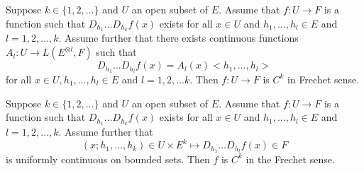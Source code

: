 \begin{proposition}
    Suppose $k \in \{ 1, 2, \ldots\}$ and $U$ an open subset of $E$. Assume that $f: U \rightarrow F$ is a function such that $D_{h_1} \ldots D_{h_k} f(x)$ exists for all $x \in U$ and $h_1, \ldots, h_l \in E$ and $l = 1, 2, \ldots, k$. Assume further that there exists continuous functions $A_l: U \rightarrow L(E^{\otimes l}, F)$ such that 
    \begin{equation}
        D_{h_1} \ldots D_{h_l} f(x) = A_l(x) < h_1, \ldots, h_l> 
    \end{equation}
    for all $x \in U, h_1, \ldots, h_l \in E$ and $l = 1, 2, \ldots k.$ Then $f: U \rightarrow F$ is $C^k$ in Frechet sense.
\end{proposition}

\begin{proposition}
    Suppose $k \in \{ 1, 2, \ldots\}$ and $U$ an open subset of $E$. Assume that $f: U \rightarrow F$ is a function such that $D_{h_1} \ldots D_{h_k} f(x)$ exists for all $x \in U$ and $h_1, \ldots, h_l \in E$ and $l = 1, 2, \ldots, k$. Assume further that 
    \begin{equation}
        (x; h_1, \ldots, h_k) \in U \times E^k \mapsto D_{h_1} \ldots D_{h_l} f(x) \in F
    \end{equation}
    is uniformly continuous on bounded sets. Then $f$ is $C^k$ in the Frechet sense.
\end{proposition}